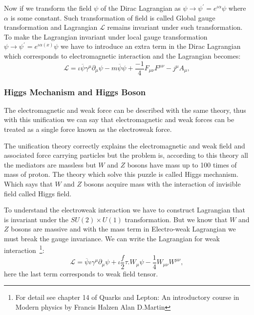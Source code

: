Now if we transform the field $\psi$ of the Dirac Lagrangian as $\psi\rightarrow\psi^{\prime}=e^{\iota\alpha}\psi$ where $\alpha$ is some constant. Such transformation of field is called Global gauge transformation and Lagrangian $\mathcal{L}$ remains invariant under such transformation.
To make the Lagrangian invariant under local gauge transformation $\psi\rightarrow\psi^{\prime}=e^{\iota\alpha(x)}\psi$ we have to introduce an extra term in the Dirac Lagrangian which corresponds to electromagnetic interaction and the Lagrangian becomes:
\begin{equation}
\mathcal{L}=\iota\overline{\psi}\gamma^{\mu}\partial_{\mu}\psi-m\overline{\psi}\psi+\frac{-1}{4}F_{\mu\nu}F^{\mu\nu}-j^{\mu}A_{\mu},
\end{equation}


\subsubsection{Higgs Mechanism and Higgs Boson}

The electromagnetic and weak force can be described with the same theory, thus with this unification we can say that electromagnetic and weak forces can be treated as a single force known as the electroweak force.

The unification theory correctly explains the electromagnetic and weak field and associated force carrying particles but the problem is, according to this theory all the mediators are massless but $W$ and $Z$ bosons have mass up to  100 times of mass of proton. The theory which solve this puzzle is called Higgs mechanism. Which says that $W$ and $Z$ bosons acquire mass with the interaction of invisible field called Higgs field.

To understand the electroweak interaction we have to construct Lagrangian that is invariant under the $SU(2)\times U(1)$ transformation.
But we know that $W$ and $Z$ bosons are massive and with the mass term in Electro-weak Lagrangian we must break the gauge invariance. We can write the Lagrangian for weak interaction~\footnote{For detail see chapter 14 of Quarks and Lepton: An introductory course in Modern physics by Francis Halzen Alan D.Martin}:
\begin{equation}
\mathcal{L}=\overline{\psi}\iota\gamma^{\mu}\partial_{\mu}\psi+\iota\frac{f}{2}\tau.W_{\mu}\psi-\frac{1}{4}W_{\mu\nu}W^{\mu\nu},
\end{equation}
here the last term corresponds to weak field tensor.

